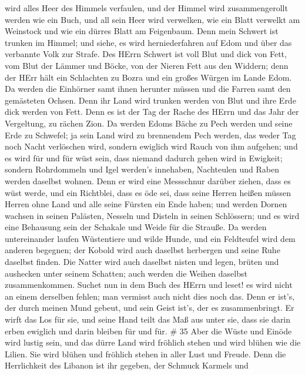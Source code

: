 wird alles Heer des Himmels verfaulen, und der Himmel wird
zusammengerollt werden wie ein Buch, und all sein Heer wird verwelken,
wie ein Blatt verwelkt am Weinstock und wie ein dürres Blatt am
Feigenbaum.  Denn mein Schwert ist trunken im Himmel; und
siehe, es wird herniederfahren auf Edom und über das verbannte Volk zur
Strafe.  Des HErrn Schwert ist voll Blut und dick von Fett,
vom Blut der Lämmer und Böcke, von der Nieren Fett aus den Widdern; denn
der HErr hält ein Schlachten zu Bozra und ein großes Würgen im Lande
Edom.  Da werden die Einhörner samt ihnen herunter müssen
und die Farren samt den gemästeten Ochsen. Denn ihr Land wird trunken
werden von Blut und ihre Erde dick werden von Fett.  Denn es
ist der Tag der Rache des HErrn und das Jahr der Vergeltung, zu rächen
Zion.  Da werden Edoms Bäche zu Pech werden und seine Erde
zu Schwefel; ja sein Land wird zu brennendem Pech werden, 
das weder Tag noch Nacht verlöschen wird, sondern ewiglich wird Rauch
von ihm aufgehen; und es wird für und für wüst sein, dass niemand
dadurch gehen wird in Ewigkeit;  sondern Rohrdommeln und
Igel werden's innehaben, Nachteulen und Raben werden daselbst wohnen.
Denn er wird eine Messschnur darüber ziehen, dass es wüst werde, und ein
Richtblei, dass es öde sei,  dass seine Herren heißen
müssen Herren ohne Land und alle seine Fürsten ein Ende haben;
 und werden Dornen wachsen in seinen Palästen, Nesseln und
Disteln in seinen Schlössern; und es wird eine Behausung sein der
Schakale und Weide für die Strauße.  Da werden
untereinander laufen Wüstentiere und wilde Hunde, und ein Feldteufel
wird dem anderen begegnen; der Kobold wird auch daselbst herbergen und
seine Ruhe daselbst finden.  Die Natter wird auch daselbst
nisten und legen, brüten und aushecken unter seinem Schatten; auch
werden die Weihen daselbst zusammenkommen.  Suchet nun in
dem Buch des HErrn und leset! es wird nicht an einem derselben fehlen;
man vermisst auch nicht dies noch das. Denn er ist's, der durch meinen
Mund gebeut, und sein Geist ist's, der es zusammenbringt. 
Er wirft das Los für sie, und seine Hand teilt das Maß aus unter sie,
dass sie darin erben ewiglich und darin bleiben für und für. \# 35
 Aber die Wüste und Einöde wird lustig sein, und das dürre
Land wird fröhlich stehen und wird blühen wie die Lilien. 
Sie wird blühen und fröhlich stehen in aller Lust und Freude. Denn die
Herrlichkeit des Libanon ist ihr gegeben, der Schmuck Karmels und
